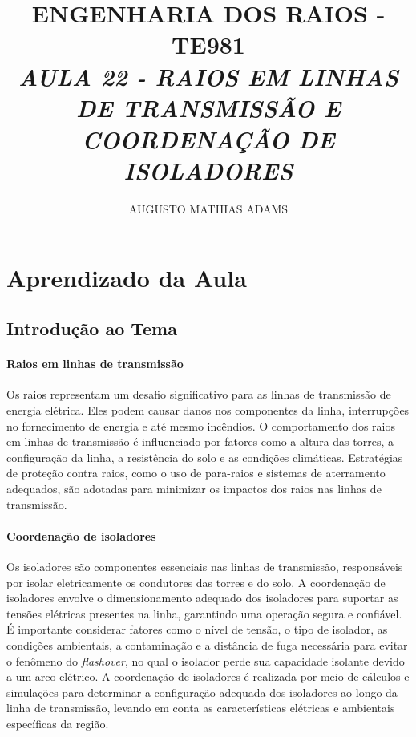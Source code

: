 \documentclass[a4paper, 12pt, onecolumn,singlespacing]{article}
\title{\normalsize{ENGENHARIA DOS RAIOS - TE981}\\ \huge{\textbf\textit{{AULA 22 - RAIOS EM LINHAS DE TRANSMISSÃO E COORDENAÇÃO DE ISOLADORES}}\\}}
\author{\small{AUGUSTO MATHIAS ADAMS}}
\begin{document}
	
	\maketitle
	
	\section{Aprendizado da Aula}
	
	\subsection{Introdução ao Tema}
		
		\paragraph{Raios em linhas de transmissão}
		
		Os raios representam um desafio significativo para as linhas de transmissão de energia elétrica. Eles podem causar danos nos componentes da linha, interrupções no fornecimento de energia e até mesmo incêndios. O comportamento dos raios em linhas de transmissão é influenciado por fatores como a altura das torres, a configuração da linha, a resistência do solo e as condições climáticas. Estratégias de proteção contra raios, como o uso de para-raios e sistemas de aterramento adequados, são adotadas para minimizar os impactos dos raios nas linhas de transmissão.
		
		\paragraph{Coordenação de isoladores}
		
		Os isoladores são componentes essenciais nas linhas de transmissão, responsáveis por isolar eletricamente os condutores das torres e do solo. A coordenação de isoladores envolve o dimensionamento adequado dos isoladores para suportar as tensões elétricas presentes na linha, garantindo uma operação segura e confiável. É importante considerar fatores como o nível de tensão, o tipo de isolador, as condições ambientais, a contaminação e a distância de fuga necessária para evitar o fenômeno do \textit{flashover}, no qual o isolador perde sua capacidade isolante devido a um arco elétrico. A coordenação de isoladores é realizada por meio de cálculos e simulações para determinar a configuração adequada dos isoladores ao longo da linha de transmissão, levando em conta as características elétricas e ambientais específicas da região.
	
\end{document}

